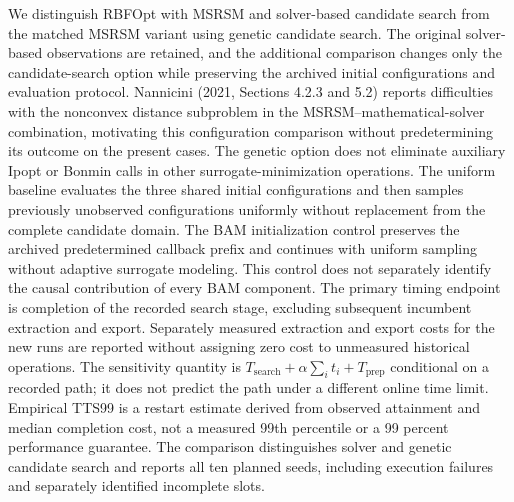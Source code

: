 We distinguish RBFOpt with MSRSM and solver-based candidate search from the matched MSRSM variant using genetic candidate search.
The original solver-based observations are retained, and the additional comparison changes only the candidate-search option while preserving the archived initial configurations and evaluation protocol.
Nannicini (2021, Sections 4.2.3 and 5.2) reports difficulties with the nonconvex distance subproblem in the MSRSM--mathematical-solver combination, motivating this configuration comparison without predetermining its outcome on the present cases.
The genetic option does not eliminate auxiliary Ipopt or Bonmin calls in other surrogate-minimization operations.
The uniform baseline evaluates the three shared initial configurations and then samples previously unobserved configurations uniformly without replacement from the complete candidate domain.
The BAM initialization control preserves the archived predetermined callback prefix and continues with uniform sampling without adaptive surrogate modeling.
This control does not separately identify the causal contribution of every BAM component.
The primary timing endpoint is completion of the recorded search stage, excluding subsequent incumbent extraction and export.
Separately measured extraction and export costs for the new runs are reported without assigning zero cost to unmeasured historical operations.
The sensitivity quantity is $T_{\mathrm{search}}+\alpha\sum_i t_i+T_{\mathrm{prep}}$ conditional on a recorded path; it does not predict the path under a different online time limit.
Empirical TTS99 is a restart estimate derived from observed attainment and median completion cost, not a measured 99th percentile or a 99 percent performance guarantee.
The comparison distinguishes solver and genetic candidate search and reports all ten planned seeds, including execution failures and separately identified incomplete slots.
